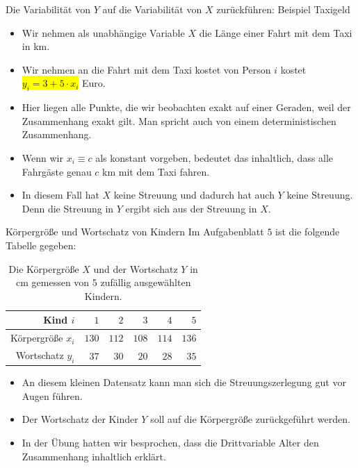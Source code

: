 \documentclass[usenames,dvipsnames,handout]{beamer}
\begin{document}
\begin{frame}{Die Variabilität von $Y$ auf die Variabilität von $X$ zurückführen: Beispiel Taxigeld}
\begin{itemize}
\item{Wir nehmen als unabhängige Variable $X$ die Länge einer Fahrt mit dem Taxi in km.}
\item{Wir nehmen an die Fahrt mit dem Taxi kostet von Person $i$ kostet \colorbox{yellow}{$y_{i}=3+5 \cdot x_{i} $} Euro.}
\item{Hier liegen alle Punkte, die wir beobachten exakt auf einer Geraden, weil der Zusammenhang
exakt gilt. Man spricht auch von einem deterministischen Zusammenhang.}
\item{Wenn wir $x_{i} \equiv c$ als konstant vorgeben, bedeutet das inhaltlich, dass alle Fahrgäste genau $c$ km mit dem Taxi fahren.}
\item{In diesem Fall hat $X$ keine Streuung und dadurch hat auch $Y$ keine Streuung. Denn die Streuung in $Y$ ergibt 
sich aus der Streuung in $X.$}
\end{itemize}
\end{frame}

\begin{frame}{Körpergröße und Wortschatz von Kindern}
Im Aufgabenblatt $5$ ist die folgende Tabelle gegeben:
 \begin{table}[h]
 \centering 
\begin{tabular}{|r|r|r|r|r|r|}
  \hline
  Kind   $i$     &   $1$    & $2$   & $3$   & $4$   & $5$ \\ \hline
  Körpergröße  $x_{i}$ & $130$ & $112$ & $108$ & $114$ & $136$  \\ \hline
  Wortschatz  $y_{i}$ & $37$& $30$ & $20$&  $28$ & $35$ \\ \hline
  \end{tabular}
 \caption{Die Körpergröße  $X$ und der Wortschatz $Y$ in cm gemessen von $5$
 zufällig ausgewählten Kindern. \label{tab1}}
 \end{table}  
 \begin{itemize}
 \item{An diesem kleinen Datensatz kann man sich die Streuungszerlegung
 gut vor Augen führen.}\pause
 \item{Der Wortschatz der Kinder $Y$ soll auf die Körpergröße zurückgeführt 
 werden.}\pause
 \item{In der Übung hatten wir besprochen, dass 
 die Drittvariable Alter den Zusammenhang inhaltlich erklärt.}
 \end{itemize}
\end{frame}
\end{document}
